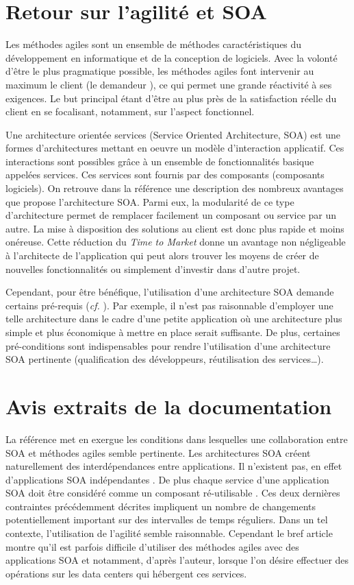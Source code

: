 \documentclass[11pt,a4paper,utf8x]{article}
\begin{document}
{\section{Retour sur l'agilité et SOA}\label{sec:ret}
Les méthodes agiles sont un ensemble de méthodes caractéristiques du développement en informatique et de la conception de logiciels. Avec la volonté d'être le plus pragmatique possible, les méthodes agiles font intervenir au maximum le client (le \og demandeur \fg{}), ce qui permet une grande réactivité à ses exigences. Le but principal étant d'être au plus près de la satisfaction réelle du client en se focalisant, notamment, sur l'aspect fonctionnel.

Une architecture orientée services (Service Oriented Architecture, SOA) est une formes d'architectures mettant en oeuvre un modèle d'interaction applicatif. Ces interactions sont possibles grâce à un ensemble de fonctionnalités basique appelées services. Ces services sont fournis par des composants (composants logiciels). On retrouve dans la référence \cite{soa} une description des nombreux avantages que propose l'architecture SOA.
Parmi eux, la modularité de ce type d'architecture permet de remplacer facilement un composant ou service par un autre. La mise à disposition des solutions au client est donc plus rapide et moins onéreuse. Cette réduction du \emph{Time to Market} donne un avantage non négligeable à l'architecte de l'application qui peut alors trouver les moyens de créer de nouvelles fonctionnalités ou simplement d'investir dans d'autre projet.

Cependant, pour être bénéfique, l'utilisation d'une architecture SOA demande certains pré-requis (\textit{cf.} \cite{soa}). Par exemple, il n'est pas raisonnable d'employer une telle architecture dans le cadre d'une petite application où une architecture plus simple et plus économique à mettre en place serait suffisante. De plus, certaines pré-conditions sont indispensables pour rendre l'utilisation d'une architecture SOA pertinente (qualification des développeurs, réutilisation des services\dots).

\section{Avis extraits de la documentation}\label{sec:avis}
La référence \cite{ibm} met en exergue les conditions dans lesquelles une collaboration entre SOA et méthodes agiles semble pertinente. Les architectures SOA créent naturellement des interdépendances entre applications. Il n'existent pas, en effet d'applications SOA \og indépendantes \fg{}. De plus chaque service d'une application SOA doit être considéré comme un composant \og ré-utilisable \fg{}. Ces deux dernières contraintes précédemment décrites impliquent un nombre de changements potentiellement important sur des intervalles de temps réguliers. Dans un tel contexte, l'utilisation de l'agilité semble raisonnable. Cependant le bref article \cite{cloud} montre qu'il est parfois difficile d'utiliser des méthodes agiles avec des applications SOA et notamment, d'après l'auteur, lorsque l'on désire effectuer des opérations sur les data centers qui hébergent ces services.

}
\end{document}

